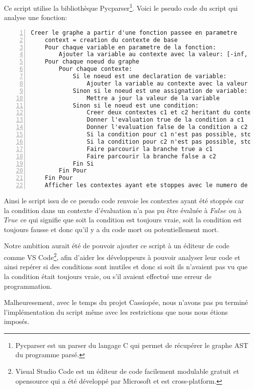 Ce script utilise la bibliothèque Pycparser\footnote{Pycparser est un parser du langage C qui permet de récupérer le graphe AST du programme parsé.}.
\newpage
Voici le pseudo code du script qui analyse une fonction:
\begin{lstlisting}[numbers=left, caption={Pseudo code du script de détection d'incohérence}, captionpos=b]
    Creer le graphe a partir d'une fonction passee en parametre
    context = creation du contexte de base
    Pour chaque variable en parametre de la fonction:
        Ajouter la variable au contexte avec la valeur: [-inf, inf]
    Pour chaque noeud du graphe
        Pour chaque contexte:
            Si le noeud est une declaration de variable:
                Ajouter la variable au contexte avec la valeur d'initialisation
            Sinon si le noeud est une assignation de variable:
                Mettre a jour la valeur de la variable
            Sinon si le noeud est une condition:
                Creer deux contextes c1 et c2 heritant du contexte actuel
                Donner l'evaluation true de la condition a c1
                Donner l'evaluation false de la condition a c2
                Si la condition pour c1 n'est pas possible, stopper c1
                Si la condition pour c2 n'est pas possible, stopper c2
                Faire parcourir la branche true a c1
                Faire parcourir la branche false a c2
            Fin Si
        Fin Pour
    Fin Pour
    Afficher les contextes ayant ete stoppes avec le numero de ligne en cause
\end{lstlisting}

Ainsi le script issu de ce pseudo code renvoie les contextes ayant été stoppés car la condition dans un contexte d'évaluation n'a pas pu être évaluée à $False$ ou à $True$ ce qui signifie que soit la condition est toujours vraie, soit la condition est toujours fausse et donc qu'il y a du code mort ou potentiellement mort.

Notre ambition aurait été de pouvoir ajouter ce script à un éditeur de code comme VS Code\footnote{Visual Studio Code est un éditeur de code facilement modulable gratuit et opensource qui a été développé par Microsoft et est cross-platform.}, afin d'aider les développeurs à pouvoir analyser leur code et ainsi repérer si des conditions sont inutiles et donc si soit ils n'avaient pas vu que la condition était toujours vraie, ou s'il avaient effectué une erreur de programmation.

Malheuresement, avec le temps du projet Cassiopée, nous n'avons pas pu terminé l'implémentation du script même avec les restrictions que nous nous étions imposés. 


